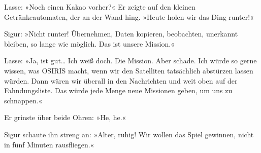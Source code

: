 Lasse: »Noch einen Kakao vorher?« Er zeigte auf den kleinen Getränkeautomaten, der an der Wand hing. »Heute holen wir das Ding runter!«

Sigur: »Nicht runter! Übernehmen, Daten kopieren, beobachten, unerkannt bleiben, so lange wie möglich.
Das ist unsere Mission.«

Lasse: »Ja, ist gut… Ich weiß doch.
Die Mission.
Aber schade.
Ich würde so gerne wissen, was OSIRIS macht, wenn wir den Satelliten tatsächlich abstürzen lassen würden.
Dann wären wir überall in den Nachrichten und weit oben auf der Fahndungsliste.
Das würde jede Menge neue Missionen geben, um uns zu schnappen.«

Er grinste über beide Ohren: »He, he.«

Sigur schaute ihn streng an: »Alter, ruhig! Wir wollen das Spiel gewinnen, nicht in fünf Minuten rausfliegen.«

